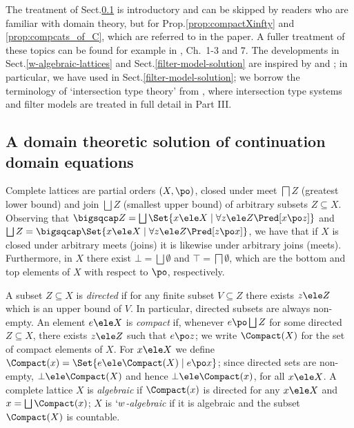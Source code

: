 \documentclass{CSML}
\begin{document}
The treatment of Sect.\skp\ref{sub:domainTheoretic} is introductory and can be skipped by readers who are familiar with domain theory, but for Prop.\skp\ref{prop:compactXinfty} and \ref{prop:compcats_of_C}, which are referred to in %
the paper. 
A fuller treatment of these topics can be found for example in \cite{Amadio-Curien'98}, Ch.~1-3 and 7. 
The developments in Sect.\skp\ref{w-algebraic-lattices} and Sect.\skp\ref{filter-model-solution} are inspired by \cite{BCD'83,Coppo-et.al'84} and \cite{Abramsky'91}; in particular, we have used \cite{Dezani-Honsell-Alessi'03} in Sect.\skp\ref{filter-model-solution}; we borrow the terminology of `intersection type theory' from \cite{Bar2013}, where intersection type systems and filter models are treated in full detail in Part III.

 \subsection{A domain theoretic solution of continuation domain equations} \label{sub:domainTheoretic}

Complete lattices are partial orders $(X,\po)$, closed under meet $\bigsqcap Z$ 
(greatest lower bound) and join $\bigsqcup Z$ (smallest upper bound) of arbitrary subsets $Z\subseteq X$. 
Observing that $\bigsqcap Z = \bigsqcup \Set{x \ele X \mid \forall z \ele Z \Pred[x \po z]}$ and $\bigsqcup Z = \bigsqcap \Set{x \ele X \mid \forall z \ele Z \Pred[ z \po x]}$, we have that if $X$ is closed under arbitrary meets (joins) it is likewise under arbitrary joins (meets). 
Furthermore, in $X$ there exist $\bot = \bigsqcup \emptyset$ and $\top = \bigsqcap \emptyset$, which are the bottom and top elements of $X$ with respect to $\po$, respectively.

A subset $Z\subseteq X$ is \emph{directed} if for any finite subset $V\subseteq Z$ there exists $z\ele Z$ which is an upper bound of $V$. 
In particular, directed subsets are always non-empty. An element $e\ele X$ is \emph{compact} if, whenever $e \po \bigsqcup Z$ for some directed $Z\subseteq X$, there exists $z\ele Z$ such that $e \po z$; we write $\Compact(X)$ for the set of compact elements of $X$. 
For $x\ele X$ we define $\Compact(x) = \Set{e \ele \Compact(X) \mid e \po x}$;
since directed sets are non-empty, $\bot \ele \Compact(X)$ and hence $\bot\ele \Compact(x)$, for all $x\ele X$. 
A complete lattice $X$ is \emph{algebraic} if $\Compact(x)$ is directed for any $x\ele X$ and $x = \bigsqcup \Compact(x)$; $X$ is \emph{$`w$-algebraic} if it is algebraic and the subset $\Compact(X)$ is countable.
\end{document}
